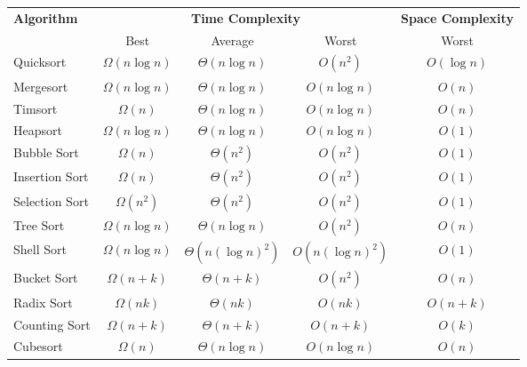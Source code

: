 \documentclass[table, xcdraw]{article}%
\begin{document}
\begin{table}[htbp]
    \centering
    \begin{tabular}{|l|c|c|c|c|}
        \hline
        \textbf{Algorithm} & \multicolumn{3}{c|}{\textbf{Time Complexity}} & \textbf{Space Complexity} \\ \cline{2-4}
        & Best & Average & Worst & Worst \\ \hline
        Quicksort & \cellcolor{orange!30}$\Omega(n \log n)$ & \cellcolor{orange!30}$\Theta(n \log n)$ & \cellcolor{red!30}$O(n^2)$ & \cellcolor{yellowgreen!30}$O(\log n)$ \\ \hline
        Mergesort & \cellcolor{orange!30}$\Omega(n \log n)$ & \cellcolor{orange!30}$\Theta(n \log n)$ & \cellcolor{orange!30}$O(n \log n)$ & \cellcolor{yellow!30}$O(n)$ \\ \hline
        Timsort & \cellcolor{yellow!30}$\Omega(n)$ & \cellcolor{orange!30}$\Theta(n \log n)$ & \cellcolor{orange!30}$O(n \log n)$ & \cellcolor{yellow!30}$O(n)$ \\ \hline
        Heapsort & \cellcolor{orange!30}$\Omega(n \log n)$ & \cellcolor{orange!30}$\Theta(n \log n)$ & \cellcolor{orange!30}$O(n \log n)$ & \cellcolor{green!30}$O(1)$ \\ \hline
        Bubble Sort & \cellcolor{yellow!30}$\Omega(n)$ & \cellcolor{red!30}$\Theta(n^2)$ & \cellcolor{red!30}$O(n^2)$ & \cellcolor{green!30}$O(1)$ \\ \hline
        Insertion Sort & \cellcolor{yellow!30}$\Omega(n)$ & \cellcolor{red!30}$\Theta(n^2)$ & \cellcolor{red!30}$O(n^2)$ & \cellcolor{green!30}$O(1)$ \\ \hline
        Selection Sort & \cellcolor{red!30}$\Omega(n^2)$ & \cellcolor{red!30}$\Theta(n^2)$ & \cellcolor{red!30}$O(n^2)$ & \cellcolor{green!30}$O(1)$ \\ \hline
        Tree Sort & \cellcolor{orange!30}$\Omega(n \log n)$ & \cellcolor{orange!30}$\Theta(n \log n)$ & \cellcolor{red!30}$O(n^2)$ & \cellcolor{yellow!30}$O(n)$ \\ \hline
        Shell Sort & \cellcolor{orange!30}$\Omega(n \log n)$ & \cellcolor{red!30}$\Theta(n(\log n)^2)$ & \cellcolor{red!30}$O(n(\log n)^2)$ & \cellcolor{green!30}$O(1)$ \\ \hline
        Bucket Sort & \cellcolor{green!30}$\Omega(n+k)$ & \cellcolor{green!30}$\Theta(n+k)$ & \cellcolor{red!30}$O(n^2)$ & \cellcolor{yellow!30}$O(n)$ \\ \hline
        Radix Sort & \cellcolor{green!30}$\Omega(nk)$ & \cellcolor{green!30}$\Theta(nk)$ & \cellcolor{green!30}$O(nk)$ & \cellcolor{yellow!30}$O(n+k)$ \\ \hline
        Counting Sort & \cellcolor{green!30}$\Omega(n+k)$ & \cellcolor{green!30}$\Theta(n+k)$ & \cellcolor{green!30}$O(n+k)$ & \cellcolor{yellow!30}$O(k)$ \\ \hline
        Cubesort & \cellcolor{yellow!30}$\Omega(n)$ & \cellcolor{orange!30}$\Theta(n \log n)$ & \cellcolor{orange!30}$O(n \log n)$ & \cellcolor{yellow!30}$O(n)$ \\ \hline
    \end{tabular}
    \label{tab:complexity}
\end{table}
\end{document}
